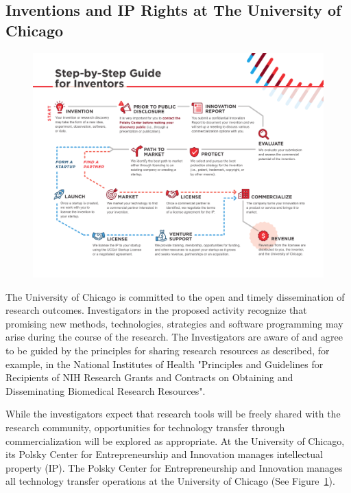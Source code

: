 \documentclass[onecolumn, compsoc,12pt]{IEEEtran}
\begin{document}
\subsection{Inventions and IP Rights at The University of Chicago}

\begin{figure}[!ht]
  \includegraphics[width=\textwidth]{Figures/Polsky-Inventor-Pathway}
  \label{figPolsky}
\end{figure}

The University of Chicago is committed to the open and timely dissemination of research outcomes. Investigators in the proposed activity recognize that promising new methods, technologies, strategies and software programming may arise during the course of the research. The Investigators are aware of and agree to be guided by the principles for sharing research resources as described, for example, in the National Institutes of Health "Principles and Guidelines for Recipients of NIH Research Grants and Contracts on Obtaining and Disseminating Biomedical Research Resources".

While the investigators expect that research tools will be freely shared with the research community, opportunities for technology transfer through commercialization will be explored as appropriate. At the University of Chicago, its Polsky Center for Entrepreneurship and Innovation manages intellectual property (IP). The Polsky Center for Entrepreneurship and Innovation manages all technology transfer operations at the University of Chicago (See Figure~\ref{figPolsky}).
\end{document}
